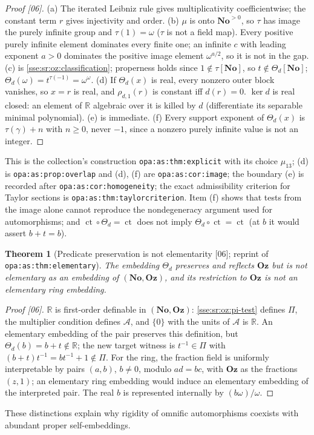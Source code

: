 \documentclass[11pt,a4paper]{article}
\numberwithin{equation}{section}
\theoremstyle{plain}
\newtheorem{theorem}{Theorem}[section]
\theoremstyle{definition}
\theoremstyle{remark}
\newcommand{\No}{\mathbf{No}}
\newcommand{\Oz}{\mathbf{Oz}}
\newcommand{\R}{\mathbb{R}}
\newcommand{\lbl}[1]{\nolinkurl{#1}}%
\newcommand{\src}[1]{\textup{\textsf{\small[#1]}}}%
\newcommand{\ctsr}{\operatorname{ct}}%
\begin{document}
\begin{proof}[Proof \src{06}]
(a) The iterated Leibniz rule gives multiplicativity coefficientwise; the
constant term $r$ gives injectivity and order. (b) $\mu$ is onto $\No^{>0}$,
so $\tau$ has image the purely infinite group and $\tau(1)=\omega$ ($\tau$ is
not a field map). Every positive purely infinite element dominates every finite
one; an infinite $c$ with leading exponent $a>0$ dominates the positive image
element $\omega^{a/2}$, so it is not in the gap. (c) is
\cref{sse:sr:oz:classification}; properness holds since $1\notin\tau[\No]$, so
$t\notin\Theta_d[\No]$; $\Theta_d(\omega)=t^{\tau(-1)}=\omega^{\omega}$.
(d) If $\Theta_d(x)$ is real, every nonzero outer block vanishes, so $x=r$ is
real, and $\rho_{d,1}(r)$ is constant iff $d(r)=0$. $\ker d$ is real closed:
an element of $\R$ algebraic over it is killed by $d$ (differentiate its
separable minimal polynomial). (e) is immediate. (f) Every support exponent of
$\Theta_d(x)$ is $\tau(\gamma)+n$ with $n\ge0$, never $-1$, since a nonzero purely
infinite value is not an integer.
\end{proof}
This is the collection's construction \lbl{opa:as:thm:explicit} with its
choice $\mu_{13}$; (d) is \lbl{opa:as:prop:overlap} and (d), (f) are
\lbl{opa:as:cor:image}; the boundary (e) is recorded after
\lbl{opa:as:cor:homogeneity}; the exact admissibility criterion for Taylor
sections is \lbl{opa:as:thm:taylorcriterion}. Item (f) shows that tests from
the image alone cannot reproduce the nondegeneracy argument used for
automorphisms; and $\ctsr\circ\Theta_d=\ctsr$ does not imply
$\Theta_d\circ\ctsr=\ctsr$ (at $b$ it would assert $b+t=b$).

\begin{theorem}[Predicate preservation is not elementarity \src{06}; reprint of \lbl{opa:as:thm:elementary}]\label{sse:sr:thm:ozelementary}
The embedding $\Theta_d$ preserves and reflects $\Oz$ but is not elementary as an
embedding of $(\No,\Oz)$, and its restriction to $\Oz$ is not an elementary
ring embedding.
\end{theorem}
\begin{proof}[Proof \src{06}]
$\R$ is first-order definable in $(\No,\Oz)$: \eqref{sse:sr:oz:pi-test} defines
$\Pi$, the multiplier condition defines $\mathcal A$, and $\{0\}$ with the units
of $\mathcal A$ is $\R$. An elementary embedding of the pair preserves this
definition, but $\Theta_d(b)=b+t\notin\R$; the new target witness is
$t^{-1}\in\Pi$ with $(b+t)t^{-1}=bt^{-1}+1\notin\Pi$. For the ring, the fraction
field is uniformly interpretable by pairs $(a,b)$, $b\ne0$, modulo $ad=bc$, with
$\Oz$ as the fractions $(z,1)$; an elementary ring embedding would induce an
elementary embedding of the interpreted pair. The real $b$ is represented
internally by $(b\omega)/\omega$.
\end{proof}
These distinctions explain why rigidity of omnific automorphisms coexists with
abundant proper self-embeddings.
\end{document}
